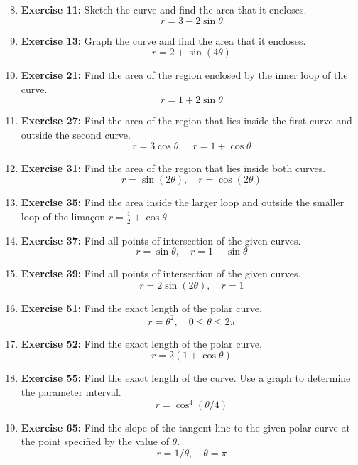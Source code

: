 \documentclass[12pt, a4paper]{article}
\begin{document}
\begin{enumerate}
    \setcounter{enumi}{7}
    \item \textbf{Exercise 11:} Sketch the curve and find the area that it encloses.
    \[ r = 3 - 2\sin\theta \]

    \item \textbf{Exercise 13:} Graph the curve and find the area that it encloses.
    \[ r = 2 + \sin(4\theta) \]

    \item \textbf{Exercise 21:} Find the area of the region enclosed by the inner loop of the curve.
    \[ r = 1 + 2\sin\theta \]
    
    \item \textbf{Exercise 27:} Find the area of the region that lies inside the first curve and outside the second curve.
    \[ r = 3\cos\theta, \quad r = 1 + \cos\theta \]

    \item \textbf{Exercise 31:} Find the area of the region that lies inside both curves.
    \[ r = \sin(2\theta), \quad r = \cos(2\theta) \]

    \item \textbf{Exercise 35:} Find the area inside the larger loop and outside the smaller loop of the limaçon $r = \frac{1}{2} + \cos\theta$.

    \item \textbf{Exercise 37:} Find all points of intersection of the given curves.
    \[ r = \sin\theta, \quad r = 1 - \sin\theta \]

    \item \textbf{Exercise 39:} Find all points of intersection of the given curves.
    \[ r = 2\sin(2\theta), \quad r = 1 \]

    \item \textbf{Exercise 51:} Find the exact length of the polar curve.
    \[ r = \theta^2, \quad 0 \le \theta \le 2\pi \]

    \item \textbf{Exercise 52:} Find the exact length of the polar curve.
    \[ r = 2(1 + \cos\theta) \]

    \item \textbf{Exercise 55:} Find the exact length of the curve. Use a graph to determine the parameter interval.
    \[ r = \cos^4(\theta/4) \]

    \item \textbf{Exercise 65:} Find the slope of the tangent line to the given polar curve at the point specified by the value of $\theta$.
    \[ r = 1/\theta, \quad \theta = \pi \]


\end{enumerate}
\end{document}
